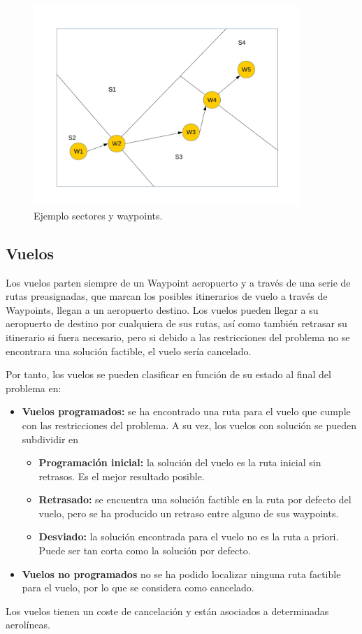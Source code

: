 \begin{figure}[h]
	\begin{center}
		\centering
		\includegraphics[width=0.9\textwidth]{./imagenes/descripcion_problema/sectoresYWaypoints.jpg}
		\caption{Ejemplo sectores y waypoints.}
		\label{fig: Ejemplo sectores y waypoints}
	\end{center}
\end{figure}


\subsection*{Vuelos}
Los vuelos parten siempre de un Waypoint aeropuerto y a través de una serie de rutas preasignadas, que marcan los posibles itinerarios de vuelo a través de Waypoints, llegan a un aeropuerto destino. Los vuelos pueden llegar a su aeropuerto de destino por cualquiera de sus rutas, así como también retrasar su itinerario si fuera necesario, pero si debido a las restricciones del problema no se encontrara una solución factible, el vuelo sería cancelado.

Por tanto, los vuelos se pueden clasificar en función de su estado al final del problema en:
\begin{itemize}
	\item \textbf{Vuelos programados:} se ha encontrado una ruta para el vuelo que cumple con las restricciones del problema. A su vez, los vuelos con solución se pueden subdividir en
	\begin{itemize}
		\item \textbf{Programación inicial:} la solución del vuelo es la ruta inicial sin retrasos. Es el mejor resultado posible.
		\item \textbf{Retrasado:} se encuentra una solución factible en la ruta por defecto del vuelo, pero se ha producido un retraso entre alguno de sus waypoints.
		\item \textbf{Desviado:} la solución encontrada para el vuelo no es la ruta a priori. Puede ser tan corta como la solución por defecto.
	\end{itemize}
	\item \textbf{Vuelos no programados} no se ha podido localizar ninguna ruta factible para el vuelo, por lo que se considera como cancelado.
\end{itemize}
Los vuelos tienen un coste de cancelación y están asociados a determinadas aerolíneas.


